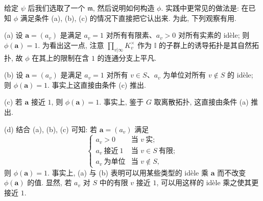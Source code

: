\begin{remark}\label{rem:v.4.9}
给定 $\psi$ 后我们选取了一个 $\mathfrak{m}$, 然后说明如何构造 $\phi$. 实践中更常见的做法是: 在已知 $\phi$ 满足条件 (a), (b), (c) 的情况下直接把它认出来. 为此, 下列观察有用.

(a) 设 $\mathbf{a}=(a_v)$ 是满足 $a_v=1$ 对所有有限素、$a_v>0$ 对所有实素的 idèle; 则 $\phi(\mathbf{a})=1$. 为看出这一点, 注意 $\prod_{v|\infty}K_v^{\times}$ 作为 $\mathbb{I}$ 的子群上的诱导拓扑是其自然拓扑, 故 $\phi$ 在其上的限制在含 $1$ 的连通分支上平凡.

(b) 设 $\mathbf{a}=(a_v)$ 是满足 $a_v=1$ 对所有 $v\in S$、$a_v$ 为单位对所有 $v\notin S$ 的 idèle; 则 $\phi(\mathbf{a})=1$. 事实上这直接由条件 (c) 推出.

(c) 若 $\mathbf{a}$ \guillemotleft 接近 $1$\guillemotright, 则 $\phi(\mathbf{a})=1$. 事实上, 鉴于 $G$ 取离散拓扑, 这直接由条件 (a) 推出.

(d) 结合 (a), (b), (c) 可知: 若 $\mathbf{a}=(a_v)$ 满足
\[
\begin{cases}
a_v>0 & \text{当 } v\ \text{实};\\
a_v\ \text{接近}\ 1 & \text{当 } v\in S\ \text{有限};\\
a_v\ \text{为单位} & \text{当 } v\notin S,
\end{cases}
\]
则 $\phi(\mathbf{a})=1$. 事实上, (a) 与 (b) 表明可以用某些类型的 idèle 乘 $\mathbf{a}$ 而不改变 $\phi(\mathbf{a})$ 的值. 显然, 若 $a_v$ 对 $S$ 中的有限 $v$ 接近 $1$, 可以用这样的 idèle 乘之使其更接近 $1$.
\end{remark}

